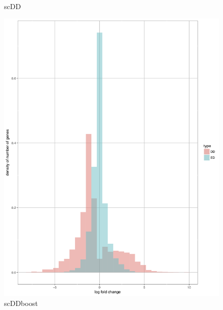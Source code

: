 \documentclass[11pt]{amsart}
\begin{document}
\begin{figure}[H]
  \caption{scDD}\label{fig:scDD}
\endminipage\hfill
{}
  \includegraphics[width=\linewidth]{DEC_NPC_scddb.png}
  \caption{scDDboost}\label{fig:scDDboost}
\endminipage\hfill
{}%

\end{figure}
\end{document}
